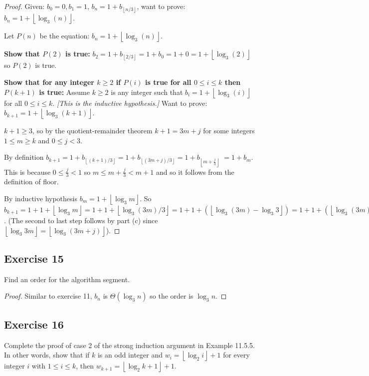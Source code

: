 \documentclass[14pt]{extarticle}
\newcommand{\floor}[1]{{\left\lfloor#1\right\rfloor}}
\begin{document}
\begin{proof}
    Given: \(b_0 = 0, b_1 = 1\), \(b_n = 1 + b_{\floor{n/3}}\), want to prove: \(b_n = 1 + \floor{\log_3(n)}\).

    Let \(P(n)\) be the equation: \(b_n = 1 + \floor{\log_3(n)}\).

        {\bf Show that \(P(2)\) is true:} \(b_2 = 1 + b_{\floor{2/3}} = 1 + b_0 = 1 + 0 = 1 + \floor{\log_3(2)}\) so \(P(2)\) is
    true.

        {\bf Show that for any integer \(k \geq 2\) if \(P(i)\) is true for all \(0 \leq i \leq k\) then \(P(k+1)\) is true:}
    Assume \(k \geq 2\) is any integer such that \(b_i = 1 + \floor{\log_3(i)}\) for all \(0 \leq i \leq k\). {\it [This
                is the inductive hypothesis.]} Want to prove: \(b_{k+1} = 1 + \floor{\log_3(k+1)}\).

    \(k+1 \geq 3\), so by the quotient-remainder theorem \(k+1 = 3m+j\) for some integers \(1\leq m\geq k\) and \(0\leq j< 3\).

    By definition \(b_{k+1} = 1 + b_{\floor{(k+1)/3}} = 1 + b_{\floor{(3m+j)/3}} = 1 + b_{\floor{m + \frac{j}{3}}}\)
    \( = 1 + b_m\). This is because \(0 \leq \frac{j}{3} < 1\) so \(m \leq m+\frac{j}{3} < m+1\) and so it follows from the
    definition of floor.

    By inductive hypothesis \(b_m = 1 + \floor{\log_3 m}\). So \(b_{k+1} = 1 + 1 + \floor{\log_3 m} = 1 + 1 + \floor{\log_3
        (3m)/3} = 1 + 1 + (\floor{\log_3 (3m) - \log_3 3}) = 1 + 1 + (\floor{\log_3 (3m) - 1}) = 1 + 1 + \floor{\log_3 (3m)} - 1)
    = 1 + \floor{\log_3(3m)} = 1 + \floor{\log_3(3m + j)} = 1 + \floor{\log_3 (k+1)}\). (The second to last step follows by part (c) since \(\floor{\log_3 3m} = \floor{\log_3(3m+j)}\)).
\end{proof}

\subsection{Exercise 15}
Find an order for the algorithm segment.

\begin{proof}
    Similar to exercise 11, \(b_n\) is \(\Theta(\log_3 n)\) so the order is \(\log_3 n\).
\end{proof}

\subsection{Exercise 16}
Complete the proof of case 2 of the strong induction argument in Example 11.5.5. In other words, show that if \(k\) is an
odd integer and \(w_i = \floor{\log_2 i} + 1\) for every integer \(i\) with \(1 \leq i \leq k\), then \(w_{k+1} =
\floor{\log_2 k + 1} + 1\).
\end{document}
